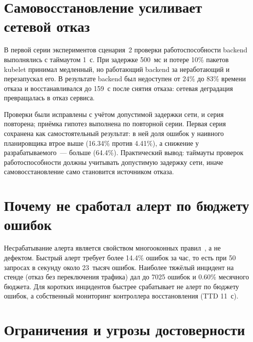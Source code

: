 \section{Самовосстановление усиливает сетевой отказ}

В первой серии экспериментов сценария~2 проверки работоспособности backend
выполнялись с таймаутом 1~с. При задержке 500~мс и потере 10\% пакетов
kubelet принимал медленный, но работающий backend за неработающий и
перезапускал его. В результате backend был недоступен от 24\% до 83\%
времени отказа и восстанавливался до 159~с после снятия отказа: сетевая
деградация превращалась в отказ сервиса.

Проверки были исправлены с учётом допустимой задержки сети, и серия
повторена; приёмка гипотез выполнена по повторной серии. Первая серия
сохранена как самостоятельный результат: в ней доля ошибок у наивного
планировщика втрое выше (16.34\% против 4.41\%), а снижение у
разрабатываемого~--- больше (64.4\%). Практический вывод: таймауты проверок
работоспособности должны учитывать допустимую задержку сети, иначе
самовосстановление само становится источником отказа.

\section{Почему не сработал алерт по бюджету ошибок}

Несрабатывание алерта является свойством многооконных правил~\cite{sre-workbook},
а не дефектом. Быстрый алерт требует более 14.4\% ошибок за час, то есть при
50 запросах в секунду около 23~тысяч ошибок. Наиболее тяжёлый инцидент на
стенде (отказ без переключения трафика) дал до 7025 ошибок и 0.60\% месячного
бюджета. Для коротких инцидентов быстрее срабатывает не алерт по бюджету
ошибок, а собственный мониторинг контроллера восстановления (TTD 11~с).

\section{Ограничения и угрозы достоверности}

